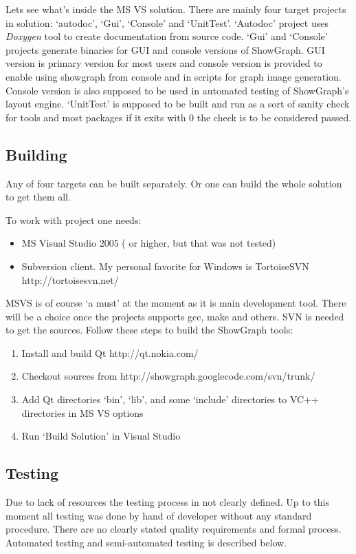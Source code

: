 \documentclass[11pt,twoside,a4paper]{article}
\begin{document}
Lets see what's inside the MS VS solution. There are mainly four target projects in solution: `autodoc', `Gui', `Console' and `UnitTest'. `Autodoc' project uses \emph{Doxygen} tool to create documentation from source code. `Gui' and `Console' projects generate binaries for GUI and console versions of ShowGraph. GUI version is primary version for most users and console version is provided to enable using showgraph from console and in scripts for graph image generation. Console version is also supposed to be used in automated testing of ShowGraph's layout engine. `UnitTest' is supposed to be built and run as a sort of sanity check for tools and most packages if it exits with 0 the check is to be considered passed.


\subsection{Building}
Any of four targets can be built separately. Or one can build the whole solution to get them all.

To work with project one needs:
\begin{itemize}
\item MS Visual Studio 2005 ( or higher, but that was not tested)\
\item Subversion client. My personal favorite for Windows is TortoiseSVN http://tortoisesvn.net/
\end{itemize}

MSVS is of course `a must' at the moment as it is main development tool. There will be a choice once the projects supports gcc, make and others. SVN is needed to get the sources. Follow these steps to build the ShowGraph tools:
\begin{enumerate}
\item Install and build Qt http://qt.nokia.com/
\item Checkout sources from http://showgraph.googlecode.com/svn/trunk/
\item Add Qt directories `bin', `lib', and some `include' directories to VC++ directories in MS VS options
\item Run `Build Solution' in Visual Studio
\end{enumerate}

\subsection{Testing}
Due to lack of resources the testing process in not clearly defined. Up to this moment all testing was done by hand of developer without any standard procedure. There are no clearly stated quality requirements and formal process. Automated testing and semi-automated testing is described below.
\end{document}
